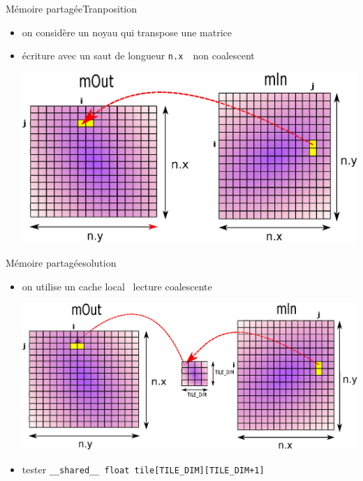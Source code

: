 \documentclass[11pt,mathserif]{beamer}
\newcommand{\gezi}{\faLongArrowRight}
\newcommand{\argi}{\faLightbulbO}
\newcommand{\pozik}{\faSmileO}
\newcommand{\triste}{\faFrownO}
\newcommand{\adibi}{\faCommentO}
\newcommand{\harritu}{\faExclamation}
\begin{document}
\begin{frame}{Mémoire partagée}{Tranposition}
  \begin{itemize}[<+->]
    \item[\adibi] on considère un noyau qui transpose une matrice
  
    \item[\triste] écriture avec un saut de longueur {\tt n.x }\gezi\ non coalescent \harritu
\begin{center}
  \includegraphics[width=0.7\linewidth]{fig/transpose1.eps}
\end{center}
   \end{itemize}
\end{frame}

\begin{frame}{Mémoire partagée}{solution}
  \begin{itemize}[<+->]
    \item[\argi] on utilise un cache local \gezi\ lecture coalescente \pozik
  
\begin{center}
  \includegraphics[width=0.60\linewidth]{fig/transpose2.eps}
\end{center}
   \item[\faMagic] tester {\tt \_\_shared\_\_ float tile[TILE\_DIM][TILE\_DIM+1]} 
   \end{itemize}
\end{frame}
\end{document}
